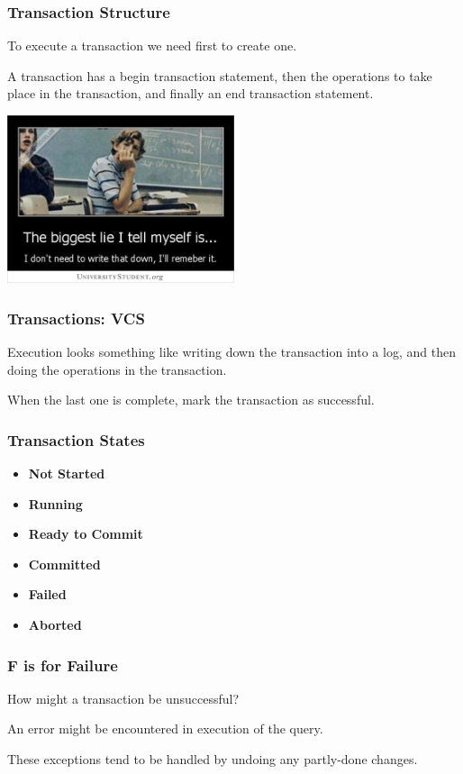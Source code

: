 \begin{frame}
\frametitle{Transaction Structure}
To execute a transaction we need first to create one. 

A transaction has a begin transaction statement, then the operations to take place in the transaction, and finally an end transaction statement. 

\begin{center}
	\includegraphics[width=0.5\textwidth]{images/rememberit.jpg}
\end{center}

\end{frame}

\begin{frame}
\frametitle{Transactions: VCS}


Execution looks something like writing down the transaction into a log, and then doing the operations in the transaction. 

When the last one is complete, mark the transaction as successful. 


\end{frame}

\begin{frame}
\frametitle{Transaction States}
\begin{itemize}
\item \textbf{Not Started}
\item \textbf{Running}
\item \textbf{Ready to Commit}
\item \textbf{Committed}
\item \textbf{Failed}
\item \textbf{Aborted}
\end{itemize}

\end{frame}

\begin{frame}
\frametitle{F is for Failure}

How might a transaction be unsuccessful? 

An error might be encountered in execution of the query.

These exceptions tend to be handled by undoing any partly-done changes.

\end{frame}

